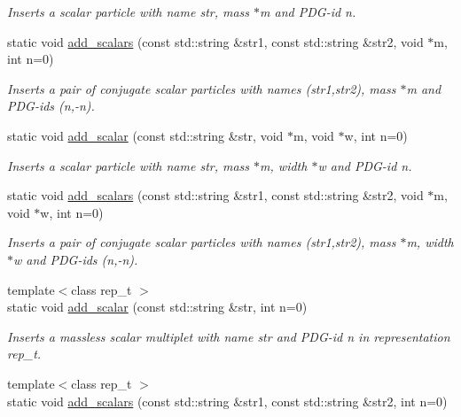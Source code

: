 \begin{DoxyCompactItemize}
\begin{DoxyCompactList}\small\item\em Inserts a scalar particle with name str, mass $\ast$m and P\+D\+G-\/id n. \end{DoxyCompactList}\item 
\hypertarget{a00372_ae9c3e377abcb541b43a3e45b53b5f627}{}static void \hyperlink{a00372_ae9c3e377abcb541b43a3e45b53b5f627}{add\+\_\+scalars} (const std\+::string \&str1, const std\+::string \&str2, void $\ast$m, int n=0)\label{a00372_ae9c3e377abcb541b43a3e45b53b5f627}

\begin{DoxyCompactList}\small\item\em Inserts a pair of conjugate scalar particles with names (str1,str2), mass $\ast$m and P\+D\+G-\/ids (n,-\/n). \end{DoxyCompactList}\item 
\hypertarget{a00372_a1db50ccce26c6d65aad150720cf45161}{}static void \hyperlink{a00372_a1db50ccce26c6d65aad150720cf45161}{add\+\_\+scalar} (const std\+::string \&str, void $\ast$m, void $\ast$w, int n=0)\label{a00372_a1db50ccce26c6d65aad150720cf45161}

\begin{DoxyCompactList}\small\item\em Inserts a scalar particle with name str, mass $\ast$m, width $\ast$w and P\+D\+G-\/id n. \end{DoxyCompactList}\item 
\hypertarget{a00372_aee7b9562b32be5e4dffbee9071fe750f}{}static void \hyperlink{a00372_aee7b9562b32be5e4dffbee9071fe750f}{add\+\_\+scalars} (const std\+::string \&str1, const std\+::string \&str2, void $\ast$m, void $\ast$w, int n=0)\label{a00372_aee7b9562b32be5e4dffbee9071fe750f}

\begin{DoxyCompactList}\small\item\em Inserts a pair of conjugate scalar particles with names (str1,str2), mass $\ast$m, width $\ast$w and P\+D\+G-\/ids (n,-\/n). \end{DoxyCompactList}\item 
\hypertarget{a00372_a029e8bbd411f974616ef7e1220d9e9f0}{}{\footnotesize template$<$class rep\+\_\+t $>$ }\\static void \hyperlink{a00372_a029e8bbd411f974616ef7e1220d9e9f0}{add\+\_\+scalar} (const std\+::string \&str, int n=0)\label{a00372_a029e8bbd411f974616ef7e1220d9e9f0}

\begin{DoxyCompactList}\small\item\em Inserts a massless scalar multiplet with name str and P\+D\+G-\/id n in representation rep\+\_\+t. \end{DoxyCompactList}\item 
\hypertarget{a00372_a3054d815cf3a749525291aaed0f5d5dd}{}{\footnotesize template$<$class rep\+\_\+t $>$ }\\static void \hyperlink{a00372_a3054d815cf3a749525291aaed0f5d5dd}{add\+\_\+scalars} (const std\+::string \&str1, const std\+::string \&str2, int n=0)\label{a00372_a3054d815cf3a749525291aaed0f5d5dd}


\end{DoxyCompactItemize}
